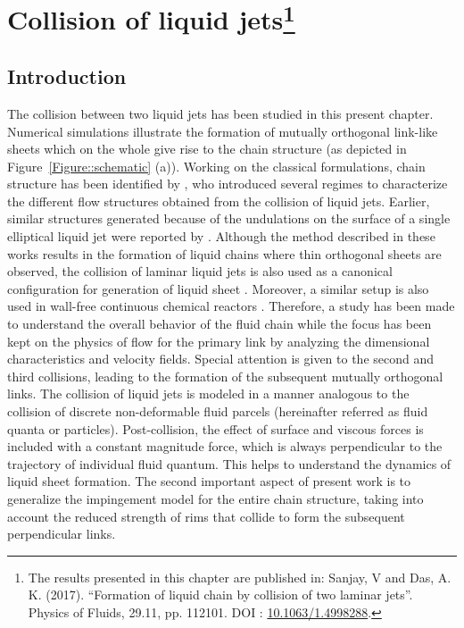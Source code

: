 \chapter[Collision of liquid jets]{Collision of liquid jets\footnote{The results presented in this chapter are published in: Sanjay, V and Das, A. K. (2017). \textquotedblleft Formation of liquid chain by collision of two laminar jets\textquotedblright. Physics of Fluids, 29.11, pp. 112101. DOI : \href{https://aip.scitation.org/doi/full/10.1063/1.4998288}{\color{black}10.1063/1.4998288}.}}\label{Chapter::jetJet}
\section{Introduction}
The collision between two liquid jets has been studied in this present chapter. Numerical simulations illustrate the formation of mutually orthogonal link-like sheets which on the whole give rise to the chain structure (as depicted in Figure~\ref{Figure::schematic} (a)). Working on the classical formulations, chain structure has been identified by \citet{bush2004collision}, who introduced several regimes to characterize the different flow structures obtained from the collision of liquid jets. Earlier, similar structures generated because of the undulations on the surface of a single elliptical liquid jet were reported by \citet{rayleigh1879capillary,rayleigh1889tension}. Although the method described in these works results in the formation of liquid chains where thin orthogonal sheets are observed, the collision of laminar liquid jets is also used as a canonical configuration for generation of liquid sheet \citep{bush2004collision}. Moreover, a similar setup is also used in wall-free continuous chemical reactors \citep{erni2013free}. Therefore, a study has been made to understand the overall behavior of the fluid chain while the focus has been kept on the physics of flow for the primary link by analyzing the dimensional characteristics and velocity fields. Special attention is given to the second and third collisions, leading to the formation of the subsequent mutually orthogonal links. The collision of liquid jets is modeled in a manner analogous to the collision of discrete non-deformable fluid parcels (hereinafter referred as fluid quanta or particles). Post-collision, the effect of surface and viscous forces is included with a constant magnitude force, which is always perpendicular to the trajectory of individual fluid quantum. This helps to understand the dynamics of liquid sheet formation. The second important aspect of present work is to generalize the impingement model for the entire chain structure, taking into account the reduced strength of rims that collide to form the subsequent perpendicular links.
